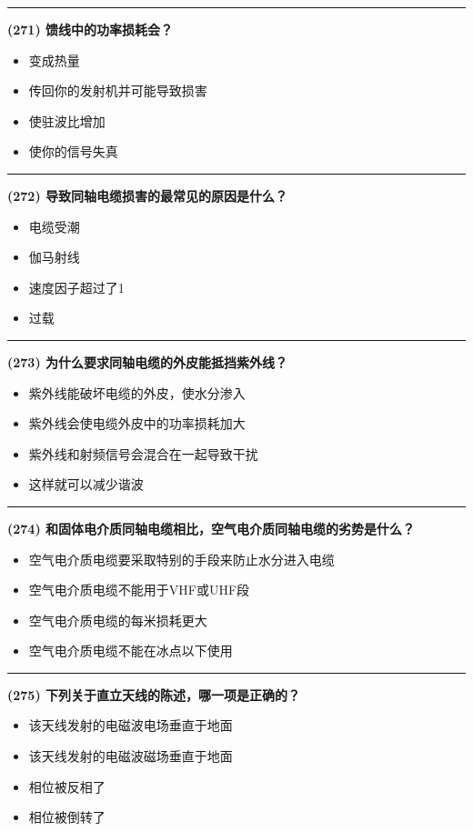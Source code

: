\documentclass[twocolumn]{ctexart}  %
\begin{document}
\noindent\rule{0.5\textwidth}{1pt}
\heiti \textbf{(271) 馈线中的功率损耗会？} \songti {\color{gray} [LK1188] }
\begin{itemize}
	\item  变成热量
	\item  传回你的发射机并可能导致损害
	\item  使驻波比增加
	\item  使你的信号失真
\end{itemize}


\noindent\rule{0.5\textwidth}{1pt}
\heiti \textbf{(272) 导致同轴电缆损害的最常见的原因是什么？} \songti {\color{gray} [LK1189] }
\begin{itemize}
	\item  电缆受潮
	\item  伽马射线
	\item  速度因子超过了1
	\item  过载
\end{itemize}


\noindent\rule{0.5\textwidth}{1pt}
\heiti \textbf{(273) 为什么要求同轴电缆的外皮能抵挡紫外线？} \songti {\color{gray} [LK1190] }
\begin{itemize}
	\item  紫外线能破坏电缆的外皮，使水分渗入
	\item  紫外线会使电缆外皮中的功率损耗加大
	\item  紫外线和射频信号会混合在一起导致干扰
	\item  这样就可以减少谐波
\end{itemize}


\noindent\rule{0.5\textwidth}{1pt}
\heiti \textbf{(274) 和固体电介质同轴电缆相比，空气电介质同轴电缆的劣势是什么？} \songti {\color{gray} [LK1191] }
\begin{itemize}
	\item  空气电介质电缆要采取特别的手段来防止水分进入电缆
	\item  空气电介质电缆不能用于VHF或UHF段
	\item  空气电介质电缆的每米损耗更大
	\item  空气电介质电缆不能在冰点以下使用
\end{itemize}


\noindent\rule{0.5\textwidth}{1pt}
\heiti \textbf{(275) 下列关于直立天线的陈述，哪一项是正确的？} \songti {\color{gray} [LK1211] }
\begin{itemize}
	\item  该天线发射的电磁波电场垂直于地面
	\item  该天线发射的电磁波磁场垂直于地面
	\item  相位被反相了
	\item  相位被倒转了
\end{itemize}
\end{document}
